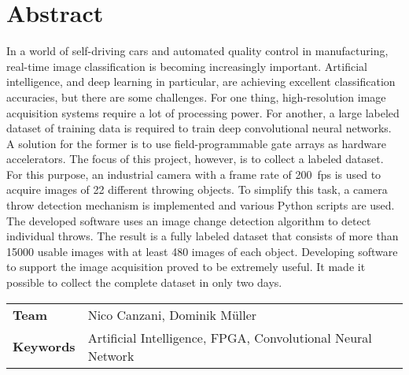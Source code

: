 \chapter*{Abstract}
In a world of self-driving cars and automated quality control in manufacturing, real-time image classification is becoming increasingly important.
Artificial intelligence, and deep learning in particular, are achieving excellent classification accuracies, but there are some challenges.
For one thing, high-resolution image acquisition systems require a lot of processing power.
For another, a large labeled dataset of training data is required to train deep convolutional neural networks.
A solution for the former is to use field-programmable gate arrays as hardware accelerators.
The focus of this project, however, is to collect a labeled dataset.
For this purpose, an industrial camera with a frame rate of \SI{200}{fps} is used to acquire images of 22 different throwing objects.
To simplify this task, a camera throw detection mechanism is implemented and various Python scripts are used.
The developed software uses an image change detection algorithm to detect individual throws.
The result is a fully labeled dataset that consists of more than \num{15000} usable images with at least 480 images of each object.
Developing software to support the image acquisition proved to be extremely useful.
It made it possible to collect the complete dataset in only two days.


\vspace{1cm}
\begin{tabular}{>{\bfseries}ll}
  Team  & Nico Canzani, Dominik M\"uller \\
  Keywords & Artificial Intelligence, FPGA, Convolutional Neural Network %
\end{tabular}
